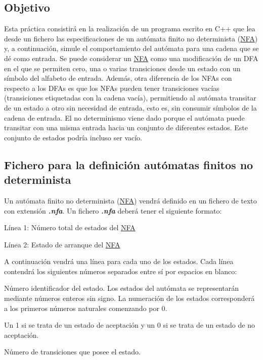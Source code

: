 \subsection*{Objetivo}

Esta práctica consistirá en la realización de un programa escrito en C++ que lea desde un fichero las especificaciones de un autómata finito no determinista (\mbox{\hyperlink{class_n_f_a}{N\+FA}}) y, a continuación, simule el comportamiento del autómata para una cadena que se dé como entrada. Se puede considerar un \mbox{\hyperlink{class_n_f_a}{N\+FA}} como una modificación de un D\+FA en el que se permiten cero, una o varias transiciones desde un estado con un símbolo del alfabeto de entrada. Además, otra diferencia de los N\+F\+As con respecto a los D\+F\+As es que los N\+F\+As pueden tener transiciones vacías (transiciones etiquetadas con la cadena vacía), permitiendo al autómata transitar de un estado a otro sin necesidad de entrada, esto es, sin consumir símbolos de la cadena de entrada. El no determinismo viene dado porque el autómata puede transitar con una misma entrada hacia un conjunto de diferentes estados. Este conjunto de estados podría incluso ser vacío.

\subsection*{Fichero para la definición autómatas finitos no determinista}

Un autómata finito no determinista (\mbox{\hyperlink{class_n_f_a}{N\+FA}}) vendrá definido en un fichero de texto con extensión {\itshape {\bfseries .nfa}}. Un fichero {\itshape {\bfseries .nfa}} deberá tener el siguiente formato\+:


\begin{DoxyItemize}
\item Línea 1\+: Número total de estados del \mbox{\hyperlink{class_n_f_a}{N\+FA}}
\item Línea 2\+: Estado de arranque del \mbox{\hyperlink{class_n_f_a}{N\+FA}}
\end{DoxyItemize}

A continuación vendrá una línea para cada uno de los estados. Cada línea contendrá los siguientes números separados entre sí por espacios en blanco\+:


\begin{DoxyItemize}
\item Número identificador del estado. Los estados del autómata se representarán mediante números enteros sin signo. La numeración de los estados corresponderá a los primeros números naturales comenzando por 0.
\item Un 1 si se trata de un estado de aceptación y un 0 si se trata de un estado de no aceptación.
\item Número de transiciones que posee el estado.
\end{DoxyItemize}

